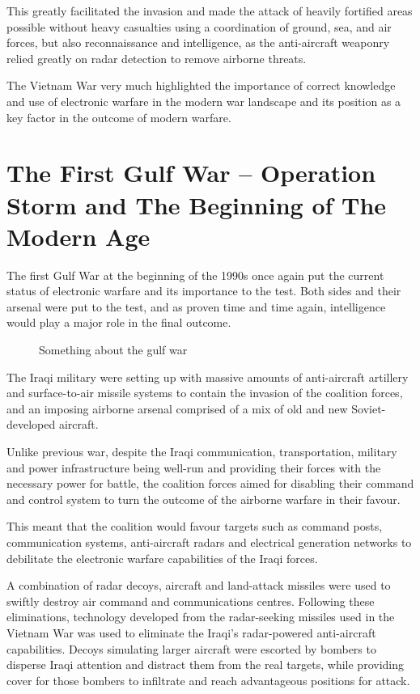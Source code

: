 \documentclass[english,purist]{ist-report}
\begin{document}
This greatly facilitated the invasion and made the attack of heavily fortified areas possible without heavy casualties using a coordination of ground, sea, and air forces, but also reconnaissance and intelligence, as the anti-aircraft weaponry relied greatly on radar detection to remove airborne threats.

The Vietnam War very much highlighted the importance of correct knowledge and use of electronic warfare in the modern war landscape and its position as a key factor in the outcome of modern warfare.

\section{The First Gulf War -- Operation Storm and The Beginning of The Modern Age}

The first Gulf War at the beginning of the 1990s once again put the current status of electronic warfare and its importance to the test. Both sides and their arsenal were put to the test, and as proven time and time again, intelligence would play a major role in the final outcome.
\begin{figure}[ht]
    \centering
    \caption{Something about the gulf war}
    \label{fig:gulfwar}
\end{figure}

The Iraqi military were setting up with massive amounts of anti-aircraft artillery and surface-to-air missile systems to contain the invasion of the coalition forces, and an imposing airborne arsenal comprised of a mix of old and new Soviet-developed aircraft.

Unlike previous war, despite the Iraqi communication, transportation, military and power infrastructure being well-run and providing their forces with the necessary power for battle, the coalition forces aimed for disabling their command and control system to turn the outcome of the airborne warfare in their favour.

This meant that the coalition would favour targets such as command posts, communication systems, anti-aircraft radars and electrical generation networks to debilitate the electronic warfare capabilities of the Iraqi forces.

A combination of radar decoys, \jamming{} aircraft and land-attack missiles were used to swiftly destroy air command and communications centres. Following these eliminations, technology developed from the radar-seeking missiles used in the Vietnam War was used to eliminate the Iraqi's radar-powered anti-aircraft capabilities. Decoys simulating larger aircraft were escorted by bombers to disperse Iraqi attention and distract them from the real targets, while providing cover for those bombers to infiltrate and reach advantageous positions for attack.
\end{document}
